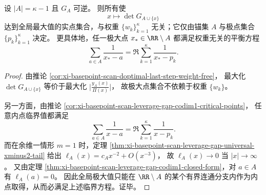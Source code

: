 \begin{theorem}[余维一精确贪婪补全的权重独立性]\label{thm:xi-basepoint-scan-codim1-exact-greedy-weight-independence}
设 \(|A|=\kappa-1\) 且 \(G_A\) 可逆。
则所有使
\[
x\longmapsto \det G_{A\cup\{x\}}
\]
达到全局最大值的实点集合，与权重 \(\{w_k\}_{k=1}^{\kappa}\) 无关；它仅由锚集 \(A\) 与极点集合 \(\{p_k\}_{k=1}^{\kappa}\) 决定。
更具体地，任一极大点 \(x_\ast\in\RR\setminus A\) 都满足权重无关的平衡方程
\[
\boxed{\;
\sum_{a\in A}\frac{1}{x_\ast-a}
=
\Re\sum_{k=1}^{\kappa}\frac{1}{x_\ast-p_k}.\;}
\]
\end{theorem}
\begin{proof}
由推论 \ref{cor:xi-basepoint-scan-doptimal-last-step-weight-free}，
最大化 \(\det G_{A\cup\{x\}}\) 等价于最大化
\(
\bigl|\frac{y_A(x)}{\Pi(x)}\bigr|
\)，
故极大点集合不依赖于权重 \(\{w_k\}\)。

另一方面，由推论 \ref{cor:xi-basepoint-scan-leverage-gap-codim1-critical-points}，
任意内点临界值都满足
\[
\sum_{a\in A}\frac{1}{x-a}
=
\Re\sum_{k=1}^{\kappa}\frac{1}{x-p_k}.
\]
而在余维一情形 \(m=1\) 时，定理 \ref{thm:xi-basepoint-scan-leverage-gap-universal-xminus2-tail} 给出
\(
\ell_A(x)=c_Ax^{-2}+O(x^{-3})
\)，
故 \(\ell_A(x)\to 0\) 当 \(|x|\to\infty\)。
又由定理 \ref{thm:xi-basepoint-scan-leverage-gap-codim1-closed-form}，对 \(a\in A\) 有 \(\ell_A(a)=0\)。
因此全局极大值只能在 \(\RR\setminus A\) 的某个有界连通分支内作为内点取得，从而必满足上述临界方程。证毕。
\end{proof}

\endinput
